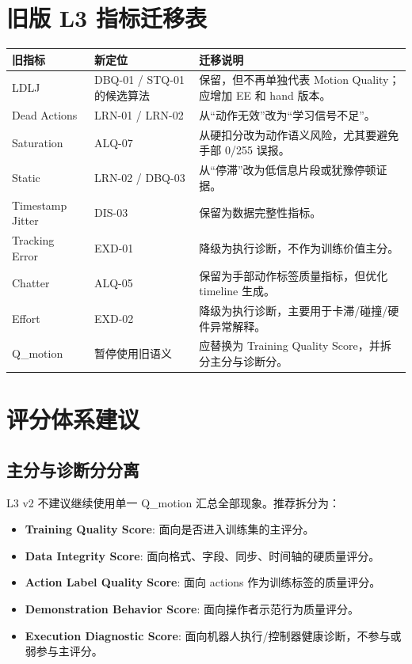 \documentclass[UTF8,zihao=-4,oneside,openany]{ctexrep}
\newcommand{\Term}[1]{\textbf{#1}}
\begin{document}
\section{旧版 L3 指标迁移表}

\begin{longtable}{L{3.2cm} L{4.2cm} L{5.8cm}}
\toprule
旧指标 & 新定位 & 迁移说明 \\
\midrule
LDLJ & DBQ-01 / STQ-01 的候选算法 & 保留，但不再单独代表 Motion Quality；应增加 EE 和 hand 版本。 \\
Dead Actions & LRN-01 / LRN-02 & 从“动作无效”改为“学习信号不足”。 \\
Saturation & ALQ-07 & 从硬扣分改为动作语义风险，尤其要避免手部 0/255 误报。 \\
Static & LRN-02 / DBQ-03 & 从“停滞”改为低信息片段或犹豫停顿证据。 \\
Timestamp Jitter & DIS-03 & 保留为数据完整性指标。 \\
Tracking Error & EXD-01 & 降级为执行诊断，不作为训练价值主分。 \\
Chatter & ALQ-05 & 保留为手部动作标签质量指标，但优化 timeline 生成。 \\
Effort & EXD-02 & 降级为执行诊断，主要用于卡滞/碰撞/硬件异常解释。 \\
Q\_motion & 暂停使用旧语义 & 应替换为 Training Quality Score，并拆分主分与诊断分。 \\
\bottomrule
\end{longtable}

\section{评分体系建议}

\subsection{主分与诊断分分离}

L3 v2 不建议继续使用单一 Q\_motion 汇总全部现象。推荐拆分为：

\begin{itemize}
  \item \Term{Training Quality Score}: 面向是否进入训练集的主评分。
  \item \Term{Data Integrity Score}: 面向格式、字段、同步、时间轴的硬质量评分。
  \item \Term{Action Label Quality Score}: 面向 actions 作为训练标签的质量评分。
  \item \Term{Demonstration Behavior Score}: 面向操作者示范行为质量评分。
  \item \Term{Execution Diagnostic Score}: 面向机器人执行/控制器健康诊断，不参与或弱参与主评分。
\end{itemize}
\end{document}
